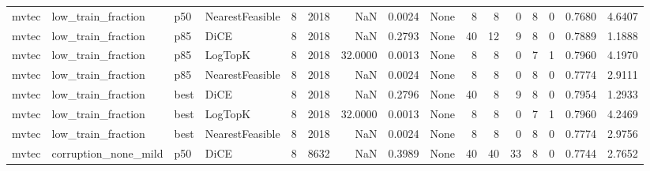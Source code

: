 \begin{tabular}{llllrrrrlrrrrrrr}
  mvtec &   low\_train\_fraction &    p50 & NearestFeasible &            8 &                 2018 &                      NaN &      0.0024 &                                               None &      8 &            8 &        0 &              8 &          0 &             0.7680 &         4.6407 \\
  mvtec &   low\_train\_fraction &    p85 &            DiCE &            8 &                 2018 &                      NaN &      0.2793 &                                               None &     40 &           12 &        9 &              8 &          0 &             0.7889 &         1.1888 \\
  mvtec &   low\_train\_fraction &    p85 &         LogTopK &            8 &                 2018 &                  32.0000 &      0.0013 &                                               None &      8 &            8 &        0 &              7 &          1 &             0.7960 &         4.1970 \\
  mvtec &   low\_train\_fraction &    p85 & NearestFeasible &            8 &                 2018 &                      NaN &      0.0024 &                                               None &      8 &            8 &        0 &              8 &          0 &             0.7774 &         2.9111 \\
  mvtec &   low\_train\_fraction &   best &            DiCE &            8 &                 2018 &                      NaN &      0.2796 &                                               None &     40 &            8 &        9 &              8 &          0 &             0.7954 &         1.2933 \\
  mvtec &   low\_train\_fraction &   best &         LogTopK &            8 &                 2018 &                  32.0000 &      0.0013 &                                               None &      8 &            8 &        0 &              7 &          1 &             0.7960 &         4.2469 \\
  mvtec &   low\_train\_fraction &   best & NearestFeasible &            8 &                 2018 &                      NaN &      0.0024 &                                               None &      8 &            8 &        0 &              8 &          0 &             0.7774 &         2.9756 \\
  mvtec & corruption\_none\_mild &    p50 &            DiCE &            8 &                 8632 &                      NaN &      0.3989 &                                               None &     40 &           40 &       33 &              8 &          0 &             0.7744 &         2.7652 \\

\end{tabular}
